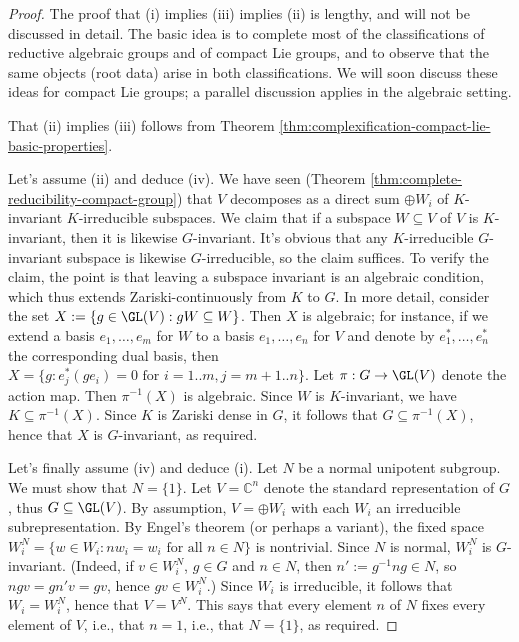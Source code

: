\documentclass[reqno]{amsart} 
\begin{document}
\begin{proof}
  The proof that (i) implies (iii) implies (ii) is lengthy, and will not be discussed in detail.  The basic idea is to complete most of the classifications of reductive algebraic groups and of compact Lie groups, and to observe that the same objects (root data) arise in both classifications.  We will soon discuss these ideas for compact Lie groups; a parallel discussion applies in the algebraic setting.

  That (ii) implies (iii) follows from Theorem \ref{thm:complexification-compact-lie-basic-properties}.

  Let's assume (ii) and deduce (iv).  We have seen (Theorem \ref{thm:complete-reducibility-compact-group}) that $V$ decomposes as a direct sum $\oplus W_i$ of $K$-invariant $K$-irreducible subspaces.  We claim that if a subspace $W \subseteq V$ of $V$ is $K$-invariant, then it is likewise $G$-invariant.  It's obvious that any $K$-irreducible $G$-invariant subspace is likewise $G$-irreducible, so the claim suffices.  To verify the claim, the point is that leaving a subspace invariant is an algebraic condition, which thus extends Zariski-continuously from $K$ to $G$.  In more detail, consider the set $X := \{g \in \GL(V) : g W \subseteq W\}$.  Then $X$ is algebraic; for instance, if we extend a basis $e_1,\dotsc,e_m$ for $W$ to a basis $e_1,\dotsc,e_n$ for $V$ and denote by $e_1^*,\dotsc,e_n^*$ the corresponding dual basis, then $X = \{g : e_j^*(g e_i) = 0 \text{ for } i=1..m, j=m+1..n\}$.  Let $\pi : G \rightarrow \GL(V)$ denote the action map.  Then $\pi^{-1}(X)$ is algebraic.  Since $W$ is $K$-invariant, we have $K \subseteq \pi^{-1}(X)$.  Since $K$ is Zariski dense in $G$, it follows that $G \subseteq \pi^{-1}(X)$, hence that $X$ is $G$-invariant, as required.

  Let's finally assume (iv) and deduce (i).  Let $N$ be a normal unipotent subgroup.  We must show that $N = \{1\}$.  Let $V = \mathbb{C}^n$ denote the standard representation of $G$, thus $G \subseteq \GL(V)$.  By assumption, $V = \oplus W_i$ with each $W_i$ an irreducible subrepresentation.  By Engel's theorem (or perhaps a variant), the fixed space $W_i^N = \{w \in W_i : n w_i = w_i \text{ for all } n \in N\}$ is nontrivial.  Since $N$ is normal, $W_i^N$ is $G$-invariant.  (Indeed, if $v \in W_i^N$, $g \in G$ and $n \in N$, then $n' := g^{-1} n g \in N$, so $n g v = g n' v = g v$, hence $g v \in W_i^N$.)  Since $W_i$ is irreducible, it follows that $W_i = W_i^N$, hence that $V = V^N$.  This says that every element $n$ of $N$ fixes every element of $V$, i.e., that $n = 1$, i.e., that $N = \{1\}$, as required.
\end{proof}
\end{document}
